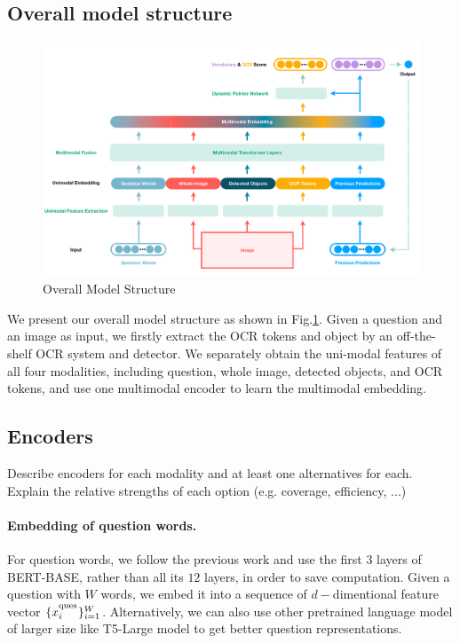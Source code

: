\documentclass[11pt,a4paper]{article}
\begin{document}
\subsection{Overall model structure}
\begin{figure}[h]
  \includegraphics[width=\textwidth]{figures/ModelStructure.pdf}
  \caption{Overall Model Structure}
  \label{fig:model}
\end{figure}
We present our overall model structure as shown in Fig.\ref{fig:model}. Given a question and an image as input, we firstly extract the OCR tokens and object by an off-the-shelf OCR system and detector. We separately obtain the uni-modal features of all four modalities, including question, whole image, detected objects, and OCR tokens, and use one multimodal encoder to learn the multimodal embedding.

\subsection{Encoders}
Describe encoders for each modality and at least one alternatives for each.  Explain the relative strengths of each option (e.g. coverage, efficiency, ...)

\paragraph{Embedding of question words.}For question words, we follow the previous work and use the first $3$ layers of BERT-BASE, rather than all its $12$ layers, in order to save computation. Given a question with $W$ words, we embed it into a sequence of $d-$dimentional feature vector $\{x^{\textsuperscript{ques}}_i\}_{i=1}^W$. Alternatively, we can also use other pretrained language model of larger size like T5-Large model to get better question representations.
\end{document}
